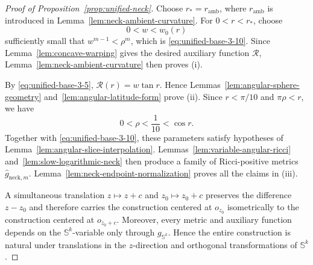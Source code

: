 \documentclass[11pt,reqno]{amsart}
\theoremstyle{definition}
\numberwithin{equation}{section}
\begin{document}
\begin{proof}[Proof of Proposition~\ref{prop:unified-neck}]
Choose \(r_*=r_{\mathrm{amb}}\), where
\(r_{\mathrm{amb}}\) is introduced in
Lemma~\ref{lem:neck-ambient-curvature}.  For
\(0<r<r_*\), choose
\[
 0<w<w_0(r)
\]
sufficiently small that \(w^{m-1}<\rho^m\), which is
\eqref{eq:unified-base-3-10}.  Since
Lemma~\ref{lem:concave-warping} gives the desired auxiliary function
\(\mathcal R\), Lemma~\ref{lem:neck-ambient-curvature} then proves
\textup{(i)}.

By \eqref{eq:unified-base-3-5}, \(\mathcal R(r)=w\tan r\).
  Hence
Lemmas~\ref{lem:angular-sphere-geometry}
and~\ref{lem:angular-latitude-form} prove \textup{(ii)}.
Since \(r<\pi/10\) and \(\pi\rho<r\), we have
\[
                 0<\rho<\frac1{10}<\cos r .
\]
Together with \eqref{eq:unified-base-3-10}, these parameters satisfy
hypotheses of Lemma~\ref{lem:angular-slice-interpolation}.
Lemmas~\ref{lem:variable-angular-ricci}
and~\ref{lem:slow-logarithmic-neck} then produce a family of
Ricci-positive metrics $\widehat g_{\mathrm{neck},m}$.
Lemma~\ref{lem:neck-endpoint-normalization} proves all the
claims in \textup{(iii)}.

A simultaneous translation \(z\mapsto z+c\) and
\(z_0\mapsto z_0+c\) preserves the difference \(z-z_0\) and therefore
carries the construction centered at \(o_{z_0}\) isometrically to the
construction centered at \(o_{z_0+c}\).  Moreover, every metric and
auxiliary function depends on the \(\mathbb S^k\)-variable only through
\(g_{\mathbb S^k}\).  Hence the entire construction is natural under
translations in the \(z\)-direction and orthogonal transformations of
\(\mathbb S^k\).
\end{proof}







\end{document}
